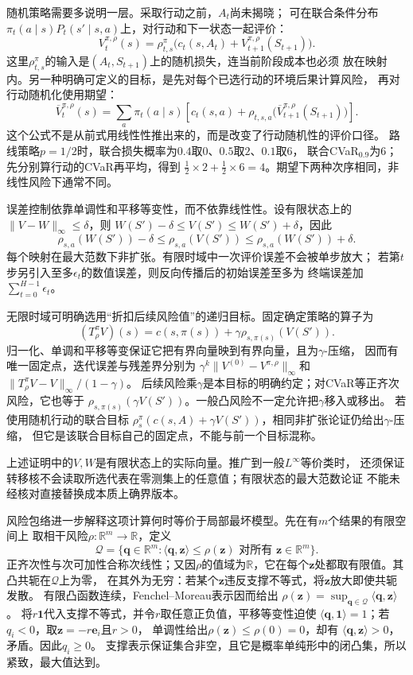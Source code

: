 随机策略需要多说明一层。采取行动之前，$A_t$尚未揭晓；
可在联合条件分布
$\pi_t(a\mid s)P_t(s'\mid s,a)$上，对行动和下一状态一起评价：
\begin{equation}
  V_t^{\pi,\rho}(s)=
  \rho^\pi_{t,s}\bigl(c_t(s,A_t)+V_{t+1}^{\pi,\rho}(S_{t+1})\bigr).
  \label{eq:policy-joint-action-risk-evaluation}
\end{equation}
这里$\rho^\pi_{t,s}$的输入是$(A_t,S_{t+1})$上的随机损失，连当前阶段成本也必须
放在映射内。另一种明确可定义的目标，是先对每个已选行动的环境后果计算风险，
再对行动随机化使用期望：
\[
  \overline V_t^{\pi,\rho}(s)=\sum_a\pi_t(a\mid s)
    \left[c_t(s,a)+\rho_{t,s,a}
      \bigl(\overline V_{t+1}^{\pi,\rho}(S_{t+1})\bigr)\right].
\]
这个公式不是从前式用线性性推出来的，而是改变了行动随机性的评价口径。
路线策略$p=1/2$时，联合损失概率为$0.4$取$0$、$0.5$取$2$、$0.1$取$6$，
联合CVaR$_{0.9}$为$6$；先分别算行动的CVaR再平均，得到
$\tfrac12\times2+\tfrac12\times6=4$。期望下两种次序相同，非线性风险下通常不同。

误差控制依靠单调性和平移等变性，而不依靠线性性。设有限状态上的
$\lVert V-W\rVert_\infty\leq\delta$，则
$W(S')-\delta\leq V(S')\leq W(S')+\delta$，因此
\[
  \rho_{s,a}(W(S'))-\delta
  \leq\rho_{s,a}(V(S'))
  \leq\rho_{s,a}(W(S'))+\delta.
\]
每个映射在最大范数下非扩张。有限时域中一次评价误差不会被单步放大；
若第$t$步另引入至多$\epsilon_t$的数值误差，则反向传播后的初始误差至多为
终端误差加$\sum_{t=0}^{H-1}\epsilon_t$。

无限时域可明确选用“折扣后续风险值”的递归目标。固定确定策略的算子为
\[
  (T^\pi_\rho V)(s)
  =c(s,\pi(s))+\gamma\rho_{s,\pi(s)}(V(S')).
\]
归一化、单调和平移等变保证它把有界向量映到有界向量，且为$\gamma$-压缩，
因而有唯一固定点，迭代误差与残差界分别为
$\gamma^k\lVert V^{(0)}-V^{\pi,\rho}\rVert_\infty$和
$\lVert T^\pi_\rho V-V\rVert_\infty/(1-\gamma)$。
后续风险乘$\gamma$是本目标的明确约定；对CVaR等正齐次风险，它也等于
$\rho_{s,\pi(s)}(\gamma V(S'))$。一般凸风险不一定允许把$\gamma$移入或移出。
若使用随机行动的联合目标
$\rho^\pi_s(c(s,A)+\gamma V(S'))$，相同非扩张论证仍给出$\gamma$-压缩，
但它是该联合目标自己的固定点，不能与前一个目标混称。

上述证明中的$V,W$是有限状态上的实际向量。推广到一般$L^\infty$等价类时，
还须保证转移核不会读取所选代表在零测集上的任意值；有限状态的最大范数论证
不能未经核对直接替换成本质上确界版本。

风险包络进一步解释这项计算何时等价于局部最坏模型。先在有$m$个结果的有限空间上
取相干风险$\rho:\mathbb R^m\to\mathbb R$，定义
\[
  \mathcal Q=\{\bm q\in\mathbb R^m:
    \langle\bm q,\bm z\rangle\leq\rho(\bm z)
    \text{ 对所有 }\bm z\in\mathbb R^m\}.
\]
正齐次性与次可加性合称次线性；又因$\rho$的值域为$\mathbb R$，它在每个$\bm z$处都取有限值。其凸共轭在$\mathcal Q$上为零，
在其外为无穷：若某个$\bm z$违反支撑不等式，将$\bm z$放大即使共轭发散。
有限凸函数连续，Fenchel--Moreau表示因而给出
$\rho(\bm z)=\sup_{\bm q\in\mathcal Q}\langle\bm q,\bm z\rangle$。
将$r\bm 1$代入支撑不等式，并令$r$取任意正负值，平移等变性迫使
$\langle\bm q,\bm1\rangle=1$；若$q_i<0$，取$\bm z=-r\bm e_i$且$r>0$，
单调性给出$\rho(\bm z)\leq\rho(0)=0$，却有
$\langle\bm q,\bm z\rangle>0$，矛盾。因此$q_i\geq0$。
支撑表示保证集合非空，且它是概率单纯形中的闭凸集，所以紧致，最大值达到。


